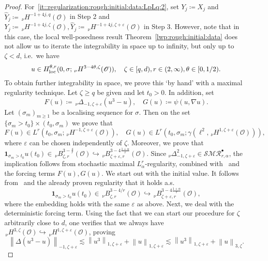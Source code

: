\documentclass[reqno]{amsart}
\newcommand{\sO}{\mathscr{O}}
\newcommand{\ce}{\coloneqq}
\newcommand{\1}{\mathbf{1}}
\newcommand{\loc}{\textup{loc}}
\newcommand{\nH}{\ensuremath{\,_\nu H}}
\newcommand{\bpsn}[1]{\ensuremath{\nH^{#1}(\sO)}}
\newcommand{\nrm}[1]{\left\lVert #1 \right\rVert}
\begin{document}
\begin{proof}
                For~\ref{it::regularization:rough:initial:data:LpLq:2},   set $Y_j\ce X_j$ and $\widehat{Y}_j\ce \bpsn{-1+4j,q}$ in Step 2 and $Y_j\ce\bpsn{-1+4j,\zeta}, \widehat{Y}_j\ce\bpsn{-1+4j,\zeta+\varepsilon}$ in Step 3.
                However, note that in this case, the local well-posedness result Theorem~\ref{lwp:rough:initial:data} does not allow us to iterate the integrability in space up to infinity, but only up to $\zeta<d$, i.e.\ we have 
                \[u\in H_\loc^{\theta,r}(0,\sigma; \bpsn{3-4\theta, \zeta}), \quad \zeta\in [q,d), r\in (2,\infty), \theta\in [0,1/2).\]
                To obtain further integrability in space, we prove this `by hand' with a maximal regularity technique. 
                Let $\zeta\ge q$ be given and let $t_0>0$. In addition, set 
                \[F(u)\ce  \,_\nu\Delta_{-1,\zeta+\varepsilon}(u^3-u), \quad G(u)\ce  \psi(u,\nabla u).\]
                Let $(\sigma_m)_{m\ge1}$ be a localising sequence for $\sigma$. 
                Then on the set $\{\sigma_m>t_0\}\times(t_0,\sigma_m)$ we prove that 
                \begin{equation*}F(u)\in L^r(t_0,\sigma_m;\bpsn{-1,\zeta+\varepsilon}),\quad  G(u)\in L^r(t_0,\sigma_m;\gamma(\ell^2,\bpsn{1,\zeta+\varepsilon})),
                \end{equation*}where $\varepsilon$ can be chosen independently of $\zeta$. Moreover, we prove that $\1_{\sigma_m>t_0}u(t_0) \in \,_\nu B_{\zeta,r}^{3-\frac{4}{r}}(\sO) \hookrightarrow \,_\nu B_{\zeta+\varepsilon,r}^{3-4\frac{1+\alpha}{r}}(\sO)$. Since $_\nu\Delta_{-1,\zeta+\varepsilon}^2 \in \mathcal{SMR}_{r,\alpha}^\bullet$, the implication follows from stochastic maximal $L^r_{\alpha}$-regularity, combined with~\cite[Proposition 3.11] {agrestiNonlinearSPDEsMaximal2025} and the forcing terms $F(u), G(u)$. 
                We start out with the initial value. It follows from~\cite[Proposition 2.1]{agrestiNonlinearSPDEsMaximal2025} and the already proven regularity that it holds a.s.\ 
                \[ \1_{\sigma_m>t_0} u(t_0) \in \,_\nu B_{\zeta,r}^{3-4/r}(\sO) \hookrightarrow \,_\nu B^{3-4\frac{1+\alpha}{r}}_{\zeta+\varepsilon,r}(\sO),\]
                where the embedding holds with the same $\varepsilon$ as above. 
                Next, we deal with the deterministic forcing term.  Using the fact that we can start our procedure for $\zeta$ arbitrarily close to $d$, one verifies that we always have $\bpsn{3,\zeta}\hookrightarrow \bpsn{1,\zeta+\varepsilon}$, proving 
                \[\nrm{\Delta(u^3-u)}_{-1,\zeta+\varepsilon}\lesssim \nrm{u^3}_{1,\zeta+\varepsilon}+\nrm{u}_{1,\zeta+\varepsilon}\lesssim \nrm{u^3}_{1,\zeta+\varepsilon} + \nrm{u}_{3,\zeta}.\]

\end{proof}
\end{document}
